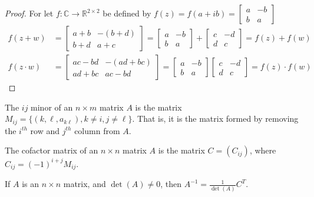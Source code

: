 \documentclass[crop=false,class=book]{standalone}
\begin{document}
\begin{proof}
For let $f:\mathbb{C}\rightarrow\mathbb{R}^{2\times 2}$ be defined by $f(z) = f(a+ib) = \begin{bmatrix}a & -b\\b & a\end{bmatrix}$
\begin{align*}
    f(z+w)&=\begin{bmatrix}a+b & -(b+d)\\b+d& a+c\end{bmatrix}=\begin{bmatrix}a&-b\\b&a\end{bmatrix}+\begin{bmatrix}c&-d\\d&c\end{bmatrix}=f(z)+f(w)\\
    f(z\cdot w)&=\begin{bmatrix}ac-bd&-(ad+bc)\\ad+bc&ac-bd\end{bmatrix}=\begin{bmatrix}a&-b\\b&a\end{bmatrix}\begin{bmatrix}c&-d\\d&c\end{bmatrix}=f(z)\cdot f(w)
\end{align*}
\end{proof}
\begin{definition}
The $ij$ minor of an $n\times m$ matrix $A$ is the matrix $M_{ij}=\{(k,\ell,a_{k\ell}),k\ne i,j\ne\ell\}$. That is, it is the matrix formed by removing the $i^{th}$ row and $j^{th}$ column from $A$.
\end{definition}
\begin{definition}
The cofactor matrix of an $n\times n$ matrix $A$ is the matrix $C=(C_{ij})$, where $C_{ij}=(-1)^{i+j}M_{ij}$.
\end{definition}
\begin{theorem}
If $A$ is an $n\times n$ matrix, and $\det(A) \ne 0$, then $A^{-1}= \frac{1}{\det(A)}C^{T}$.
\end{theorem}
\end{document}
